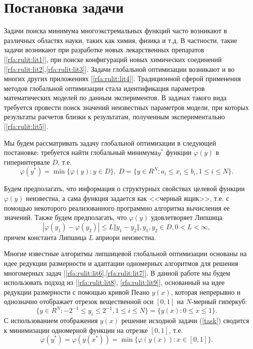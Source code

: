 \documentclass[10pt,a4paper]{book}
\begin{document}
\MakeArticleHeader

\pagebreak



\section{Постановка задачи}

Задачи поиска минимума многоэкстремальных функций часто возникают в различных областях науки, таких как химия, физика и т.д. В частности, такие задачи возникают при разработке новых лекарственных препаратов [\ref{rfa:rulit:lit1}], при поиске конфигураций новых химических соединений [\ref{rfa:rulit:lit2},\ref{rfa:rulit:lit3}]. Задачи глобальной оптимизации возникают и во многих других приложениях [\ref{rfa:rulit:lit4}]. Традиционной сферой применения методов глобальной оптимизации стала идентификация параметров математических моделей по данным экспериментов. В задачах такого вида требуется провести поиск значений неизвестных параметров модели, при которых результаты расчетов близки к результатам, полученным экспериментально [\ref{rfa:rulit:lit5}].

Мы будем рассматривать задачу глобальной оптимизации в следующей постановке: требуется найти глобальный минимума$y^*$ функции $\varphi(y)$ в гиперинтервале $D$, т.е. 
\begin{equation}
\label{task}
\varphi(y^*)=\min\{\varphi(y):y\in D\}, \; D=\{y\in R^N:a_i\leq x_i\leq{b_i}, 1\leq{i}\leq{N}\}.
\end{equation}

Будем предполагать, что информация о структурных свойствах целевой функции $\varphi(y)$ неизвестна, а сама функция задается как <<черный ящик>>, т.е. с помощью некоторого реализованного программно алгоритма вычисления ее значений. Также будем предполагать, что $\varphi(y)$ удовлетворяет Липшица 
\begin{equation}
\label{lip}
|\varphi(y_1)-\varphi(y_2)|\leq L\Vert y_1-y_2\Vert,y_1,y_2\in D,0<L<\infty,
\end{equation}
причем константа Липшица $L$ априори неизвестна.

Многие известные алгоритмы липшицевой глобальной оптимизации основаны на идее редукции размерности и адаптации одномерных алгоритмов для решения многомерных задач [\ref{rfa:rulit:lit6},\ref{rfa:rulit:lit7}]. 
В данной работе мы будем использовать подход из [\ref{rfa:rulit:lit8}, \ref{rfa:rulit:lit9}], основанный на идее редукции размерности с помощью кривой Пеано  
$y(x)$, которая непрерывно и однозначно отображает отрезок вещественной оси $[0,1]$ на $N$-мерный гиперкуб:
\begin{equation}
\label{cube}
\lbrace y\in R^N:-2^{-1}\leq y_i\leq 2^{-1}, 1\leq i\leq N\rbrace=\{y(x): 0\leq x\leq 1\}.
\end{equation}
С использованием отображения $y(x)$ решение исходной задачи (\ref{task}) сводится к минимизации одномерной функции на отрезке $[0,1]$, т.е.
\begin{equation}
\label{oneDimTask}
\varphi(y^*)=\varphi(y(x^*))=\min\{\varphi(y(x)): x\in [0,1]\}.
\end{equation}
 
\end{document}
